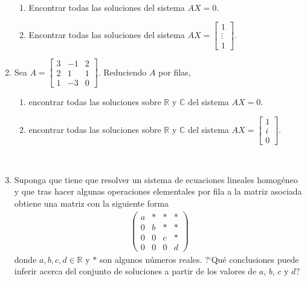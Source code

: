 \documentclass[12pt]{amsart}
\newcommand{\R}{\mathbb R}
\begin{document}
\begin{enumerate}
\

 \begin{enumerate}
   \item Encontrar todas las soluciones del sistema $AX=0$.
   \item Encontrar todas las soluciones del sistema $AX=\left[\begin{array}{c}
     1\\\vdots \\1 \end{array}\right]$.

     \end{enumerate}

     \item Sea $A=\begin{bmatrix}3 & -1 & 2 \\2 & 1 & 1 \\1&-3&0\end{bmatrix}$. Reduciendo $A$ por filas,
 \begin{enumerate}
   \item encontrar todas las soluciones sobre $\mathbb{R}$ y $\mathbb{C}$ del sistema $AX=0$.
   \item encontrar todas las soluciones sobre $\mathbb{R}$ y $\mathbb{C}$ del sistema $AX=\left[\begin{array}{c}
     1\\i\\0 \end{array}\right]$.
 \end{enumerate}



\

\item Suponga que tiene que resolver un sistema de ecuaciones lineales homog\'eneo y que tras hacer algunas operaciones elementales por fila a la matriz asociada obtiene una matriz con la siguiente forma
\begin{align*}
\left(
\begin{array}{cccc}
a & * & * & *\\
0 & b & * & *\\
0 & 0 & c & *\\
0 & 0 & 0 & d
\end{array}
\right)
\end{align*}
donde $a,b,c,d\in\R$ y $*$ son algunos n\'umeros reales.
?`Qu\'e conclusiones puede inferir acerca del conjunto de soluciones a partir de los valores de $a$, $b$, $c$ y $d$?


\end{enumerate}
\end{document}
